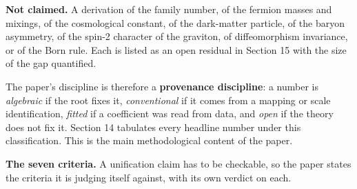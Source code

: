 \documentclass[aps,prd,amsmath,amssymb,superscriptaddress,longbibliography,floatfix,preprint]{revtex4-2}
\begin{document}
\textbf{Not claimed.} A derivation of the family number, of the fermion masses and mixings, of the cosmological constant, of the dark-matter particle, of the baryon asymmetry, of the spin-2 character of the graviton, of diffeomorphism invariance, or of the Born rule. Each is listed as an open residual in Section 15 with the size of the gap quantified.

The paper's discipline is therefore a \textbf{provenance discipline}: a number is \emph{algebraic} if the root fixes it, \emph{conventional} if it comes from a mapping or scale identification, \emph{fitted} if a coefficient was read from data, and \emph{open} if the theory does not fix it. Section 14 tabulates every headline number under this classification. This is the main methodological content of the paper.

\textbf{The seven criteria.} A unification claim has to be checkable, so the paper states the criteria it is judging itself against, with its own verdict on each.
\end{document}
